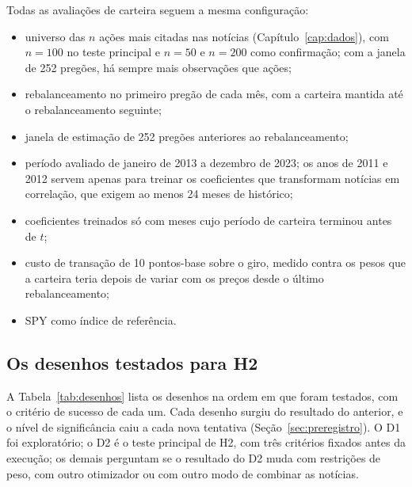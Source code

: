 Todas as avaliações de carteira seguem a mesma configuração:
\begin{itemize}
  \item universo das $n$ ações mais citadas nas notícias (Capítulo~\ref{cap:dados}), com $n=100$ no
        teste principal e $n=50$ e $n=200$ como confirmação; com a janela de 252 pregões, há sempre mais
        observações que ações;
  \item rebalanceamento no primeiro pregão de cada mês, com a carteira mantida até o rebalanceamento
        seguinte;
  \item janela de estimação de 252 pregões anteriores ao rebalanceamento;
  \item período avaliado de janeiro de 2013 a dezembro de 2023; os anos de 2011 e 2012 servem apenas
        para treinar os coeficientes que transformam notícias em correlação, que exigem ao menos 24
        meses de histórico;
  \item coeficientes treinados só com meses cujo período de carteira terminou antes de $t$;
  \item custo de transação de 10 pontos-base sobre o giro, medido contra os pesos que a carteira teria
        depois de variar com os preços desde o último rebalanceamento;
  \item SPY como índice de referência.
\end{itemize}

\subsection{Os desenhos testados para H2}

A Tabela~\ref{tab:desenhos} lista os desenhos na ordem em que foram testados, com o critério de sucesso
de cada um. Cada desenho surgiu do resultado do anterior, e o nível de significância caiu a cada nova
tentativa (Seção~\ref{sec:preregistro}). O D1 foi exploratório; o D2 é o teste principal de H2, com três
critérios fixados antes da execução; os demais perguntam se o resultado do D2 muda com restrições de
peso, com outro otimizador ou com outro modo de combinar as notícias.

